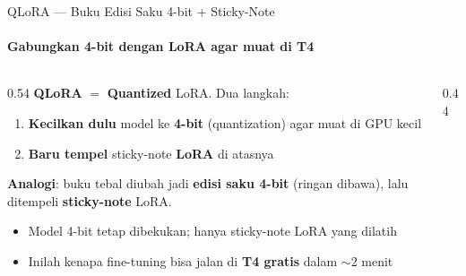 \documentclass[aspectratio=169,t]{beamer}
\begin{document}
\begin{frame}{QLoRA --- Buku Edisi Saku 4-bit + Sticky-Note}
  \framesubtitle{Gabungkan 4-bit dengan LoRA agar muat di T4}
  \begin{columns}[T]
    \begin{column}{0.54\textwidth}
      \footnotesize
      \textbf{QLoRA} $=$ \textbf{Quantized} LoRA. Dua langkah:
      \begin{enumerate}
        \item \textcolor{nvblue}{\textbf{Kecilkan dulu}} model ke \textbf{4-bit} (quantization) agar muat di GPU kecil
        \item \textcolor{nvgreen}{\textbf{Baru tempel}} sticky-note \textbf{LoRA} di atasnya
      \end{enumerate}
      \vspace{0.2em}
      \textbf{Analogi}: buku tebal diubah jadi \textbf{edisi saku 4-bit} (ringan dibawa), lalu ditempeli \textbf{sticky-note} LoRA.
      \begin{itemize}
        \item Model 4-bit tetap dibekukan; hanya sticky-note LoRA yang dilatih
        \item Inilah kenapa fine-tuning bisa jalan di \textbf{T4 gratis} dalam $\sim$2 menit
      \end{itemize}
    \end{column}
    \begin{column}{0.44\textwidth}
      \centering
    \end{column}
  \end{columns}
\end{frame}
\end{document}

